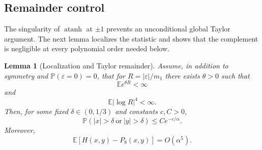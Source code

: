 \documentclass[11pt]{article}
\newtheorem{lemma}{Lemma}
\newcommand{\E}{\mathbb E}
\newcommand{\Prob}{\mathbb P}
\newcommand{\atanh}{\operatorname{atanh}}
\begin{document}
\subsection{Remainder control}
The singularity of $\atanh$ at $\pm1$ prevents an unconditional global Taylor argument. The next lemma localizes the statistic and shows that the complement is negligible at every polynomial order needed below.

\begin{lemma}[Localization and Taylor remainder]
Assume, in addition to symmetry and $\Prob(\varepsilon=0)=0$, that for $R=|\varepsilon|/m_1$ there exists $\theta>0$ such that
\begin{equation}
\E e^{\theta R}<\infty
\end{equation}
and
\begin{equation}
\E|\log R|^4<\infty.
\end{equation}
Then, for some fixed $\delta\in(0,1/3)$ and constants $c,C>0$,
\begin{equation}
\Prob(|x|>\delta\ \text{or}\ |y|>\delta)\le Ce^{-c/\alpha}.
\end{equation}
Moreover,
\begin{equation}
\E\left[H(x,y)-P_8(x,y)\right]=O(\alpha^5).
\end{equation}
\end{lemma}
\end{document}
